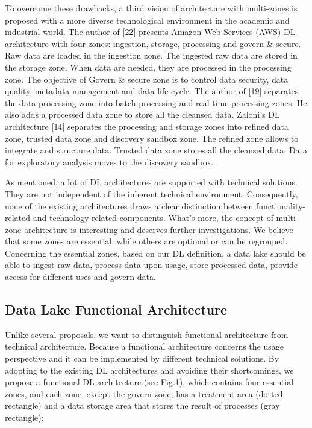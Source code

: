 \documentclass[a4paper,12pt,notitlepage,twoside,openright]{article}
\begin{document}
To overcome these drawbacks, a third vision of architecture with
multi-zones is proposed with a more diverse technological environment in
the academic and industrial world. The author of {[}22{]} presents
Amazon Web Services (AWS) DL architecture with four zones: ingestion,
storage, processing and govern \& secure. Raw data are loaded in the
ingestion zone. The ingested raw data are stored in the storage zone.
When data are needed, they are processed in the processing zone. The
objective of Govern \& secure zone is to control data security, data
quality, metadata management and data life-cycle. The author of {[}19{]}
separates the data processing zone into batch-processing and real time
processing zones. He also adds a processed data zone to store all the
cleansed data. Zaloni's DL architecture {[}14{]} separates the
processing and storage zones into refined data zone, trusted data zone
and discovery sandbox zone. The refined zone allows to integrate and
structure data. Trusted data zone stores all the cleansed data. Data for
exploratory analysis moves to the discovery sandbox.

As mentioned, a lot of DL architectures are supported with technical
solutions. They are not independent of the inherent technical
environment. Consequently, none of the existing architectures draws a
clear distinction between functionality-related and technology-related
components. What's more, the concept of multi-zone architecture is
interesting and deserves further investigations. We believe that some
zones are essential, while others are optional or can be regrouped.
Concerning the essential zones, based on our DL definition, a data lake
should be able to ingest raw data, process data upon usage, store
processed data, provide access for different uses and govern data.

\hypertarget{data-lake-functional-architecture}{%
\subsection{Data Lake Functional
Architecture}\label{data-lake-functional-architecture}}

Unlike several proposals, we want to distinguish functional architecture
from technical architecture. Because a functional architecture concerns
the usage perspective and it can be implemented by different technical
solutions. By adopting to the existing DL architectures and avoiding
their shortcomings, we propose a functional DL architecture (see Fig.1),
which contains four essential zones, and each zone, except the govern
zone, has a treatment area (dotted rectangle) and a data storage area
that stores the result of processes (gray rectangle):
\end{document}
